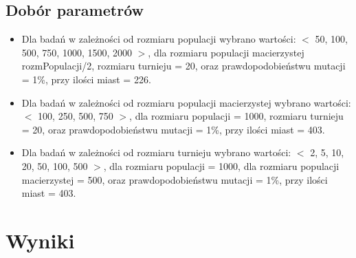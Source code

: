 \documentclass{article}
\begin{document}
\subsection{Dobór parametrów}
\begin{itemize}
	\item Dla badań w zależności od rozmiaru populacji wybrano wartości: $<$ 50, 100, 500, 750, 1000, 1500, 2000 $>$, dla rozmiaru populacji macierzystej rozmPopulacji/2, rozmiaru turnieju = 20, oraz prawdopodobieństwu mutacji = 1\%, przy ilości miast = 226.
	\item Dla badań w zależności od rozmiaru populacji macierzystej wybrano wartości: $<$ 100, 250, 500, 750 $>$, dla rozmiaru populacji = 1000, rozmiaru turnieju = 20, oraz prawdopodobieństwu mutacji = 1\%, przy ilości miast = 403.
	\item Dla badań w zależności od rozmiaru turnieju wybrano wartości: $<$ 2, 5, 10, 20, 50, 100, 500 $>$, dla rozmiaru populacji = 1000, dla rozmiaru populacji macierzystej = 500, oraz prawdopodobieństwu mutacji = 1\%, przy ilości miast = 403.
	
\end{itemize}

\newpage
\section{Wyniki}
\end{document}
